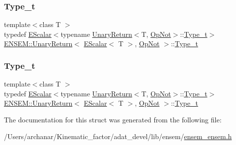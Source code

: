 \subsubsection{\texorpdfstring{Type\_t}{Type\_t}\hspace{0.1cm}{\footnotesize\ttfamily [1/2]}}
{\footnotesize\ttfamily template$<$class T $>$ \\
typedef \mbox{\hyperlink{classENSEM_1_1EScalar}{E\+Scalar}}$<$typename \mbox{\hyperlink{structENSEM_1_1UnaryReturn}{Unary\+Return}}$<$T, \mbox{\hyperlink{structENSEM_1_1OpNot}{Op\+Not}}$>$\+::\mbox{\hyperlink{structENSEM_1_1UnaryReturn_3_01EScalar_3_01T_01_4_00_01OpNot_01_4_a4e2b815087a9bd3d66be855deee7a1e5}{Type\+\_\+t}}$>$ \mbox{\hyperlink{structENSEM_1_1UnaryReturn}{E\+N\+S\+E\+M\+::\+Unary\+Return}}$<$ \mbox{\hyperlink{classENSEM_1_1EScalar}{E\+Scalar}}$<$ T $>$, \mbox{\hyperlink{structENSEM_1_1OpNot}{Op\+Not}} $>$\+::\mbox{\hyperlink{structENSEM_1_1UnaryReturn_3_01EScalar_3_01T_01_4_00_01OpNot_01_4_a4e2b815087a9bd3d66be855deee7a1e5}{Type\+\_\+t}}}

\mbox{\label{structENSEM_1_1UnaryReturn_3_01EScalar_3_01T_01_4_00_01OpNot_01_4_a4e2b815087a9bd3d66be855deee7a1e5}} 
\subsubsection{\texorpdfstring{Type\_t}{Type\_t}\hspace{0.1cm}{\footnotesize\ttfamily [2/2]}}
{\footnotesize\ttfamily template$<$class T $>$ \\
typedef \mbox{\hyperlink{classENSEM_1_1EScalar}{E\+Scalar}}$<$typename \mbox{\hyperlink{structENSEM_1_1UnaryReturn}{Unary\+Return}}$<$T, \mbox{\hyperlink{structENSEM_1_1OpNot}{Op\+Not}}$>$\+::\mbox{\hyperlink{structENSEM_1_1UnaryReturn_3_01EScalar_3_01T_01_4_00_01OpNot_01_4_a4e2b815087a9bd3d66be855deee7a1e5}{Type\+\_\+t}}$>$ \mbox{\hyperlink{structENSEM_1_1UnaryReturn}{E\+N\+S\+E\+M\+::\+Unary\+Return}}$<$ \mbox{\hyperlink{classENSEM_1_1EScalar}{E\+Scalar}}$<$ T $>$, \mbox{\hyperlink{structENSEM_1_1OpNot}{Op\+Not}} $>$\+::\mbox{\hyperlink{structENSEM_1_1UnaryReturn_3_01EScalar_3_01T_01_4_00_01OpNot_01_4_a4e2b815087a9bd3d66be855deee7a1e5}{Type\+\_\+t}}}



The documentation for this struct was generated from the following file\+:\begin{DoxyCompactItemize}
\item 
/\+Users/archanar/\+Kinematic\+\_\+factor/adat\+\_\+devel/lib/ensem/\mbox{\hyperlink{lib_2ensem_2ensem__ensem_8h}{ensem\+\_\+ensem.\+h}}\end{DoxyCompactItemize}

